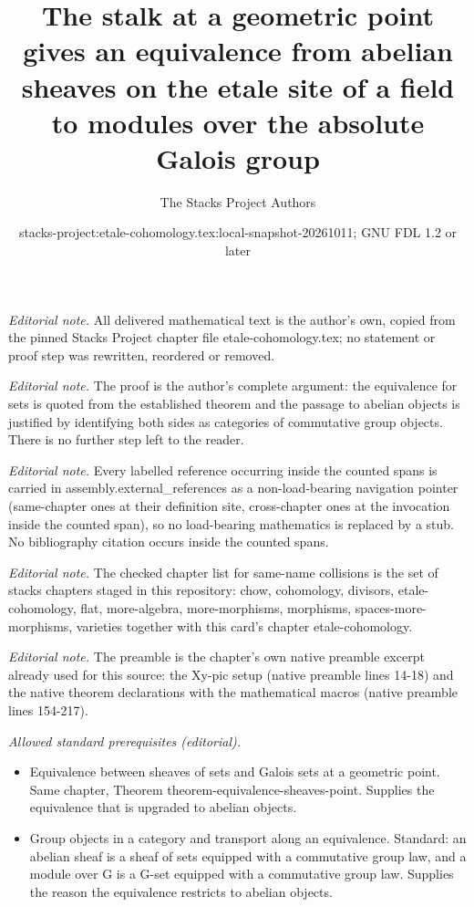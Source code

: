 \documentclass[10pt,a4paper]{amsart}
\title{The stalk at a geometric point gives an equivalence from abelian sheaves on the etale site of a field to modules over the absolute Galois group}
\author{The Stacks Project Authors}
\date{stacks-project:etale-cohomology.tex:local-snapshot-20261011; GNU FDL 1.2 or later}
\theoremstyle{plain}
\theoremstyle{definition}
\theoremstyle{remark}
\numberwithin{equation}{subsection}
\begin{document}
\maketitle
\noindent\textit{Editorial note.} All delivered mathematical text is the author's own, copied from the pinned Stacks Project chapter file etale-cohomology.tex; no statement or proof step was rewritten, reordered or removed.\par\medskip
\noindent\textit{Editorial note.} The proof is the author's complete argument: the equivalence for sets is quoted from the established theorem and the passage to abelian objects is justified by identifying both sides as categories of commutative group objects. There is no further step left to the reader.\par\medskip
\noindent\textit{Editorial note.} Every labelled reference occurring inside the counted spans is carried in assembly.external\_references as a non-load-bearing navigation pointer (same-chapter ones at their definition site, cross-chapter ones at the invocation inside the counted span), so no load-bearing mathematics is replaced by a stub. No bibliography citation occurs inside the counted spans.\par\medskip
\noindent\textit{Editorial note.} The checked chapter list for same-name collisions is the set of stacks chapters staged in this repository: chow, cohomology, divisors, etale-cohomology, flat, more-algebra, more-morphisms, morphisms, spaces-more-morphisms, varieties together with this card's chapter etale-cohomology.\par\medskip
\noindent\textit{Editorial note.} The preamble is the chapter's own native preamble excerpt already used for this source: the Xy-pic setup (native preamble lines 14-18) and the native theorem declarations with the mathematical macros (native preamble lines 154-217).\par\medskip
\noindent\textit{Allowed standard prerequisites (editorial).}\begin{itemize}
\item Equivalence between sheaves of sets and Galois sets at a geometric point. Same chapter, Theorem theorem-equivalence-sheaves-point. Supplies the equivalence that is upgraded to abelian objects.
\item Group objects in a category and transport along an equivalence. Standard: an abelian sheaf is a sheaf of sets equipped with a commutative group law, and a module over G is a G-set equipped with a commutative group law. Supplies the reason the equivalence restricts to abelian objects.
\end{itemize}\medskip
\end{document}

